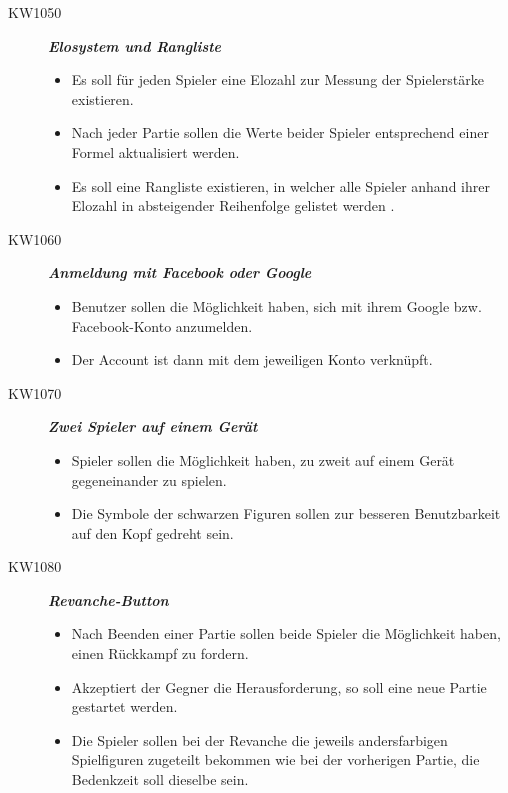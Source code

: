 \documentclass[parskip=full]{scrartcl}
\begin{document}
\begin{description}
	\item[KW1050] \textbf{\textit{\gls{Elo}system und Rangliste}}
	\begin{itemize}
	\item Es soll für jeden Spieler eine \gls{Elo}zahl zur Messung der Spielerstärke existieren.
	\item Nach jeder Partie sollen die Werte beider Spieler entsprechend einer Formel aktualisiert werden.
	\item Es soll eine Rangliste existieren, in welcher alle Spieler anhand ihrer \gls{Elo}zahl in absteigender Reihenfolge gelistet werden .
	\end{itemize}
	
	\item[KW1060] \textbf{\textit{Anmeldung mit Facebook oder Google}}
	\begin{itemize}
	\item Benutzer sollen die Möglichkeit haben, sich mit ihrem Google bzw. Facebook-Konto anzumelden.
	\item Der Account ist dann mit dem jeweiligen Konto verknüpft.
	\end{itemize}
	
	\item[KW1070] \textbf{\textit{Zwei Spieler auf einem Gerät}}
	\begin{itemize}
	\item Spieler sollen die Möglichkeit haben, zu zweit auf einem Gerät gegeneinander zu spielen.
	\item Die Symbole der schwarzen Figuren sollen zur besseren Benutzbarkeit auf den Kopf gedreht sein.
	\end{itemize}
	
	\item[KW1080] \textbf{\textit{\gls{Revanche}-Button}}
	\begin{itemize}
	\item Nach Beenden einer Partie sollen beide Spieler die Möglichkeit haben, einen Rückkampf zu fordern.
	\item Akzeptiert der Gegner die Herausforderung, so soll eine neue Partie gestartet werden.
	\item Die Spieler sollen bei der Revanche die jeweils andersfarbigen Spielfiguren zugeteilt bekommen wie bei der vorherigen Partie, die \gls{Bedenkzeit} soll dieselbe sein.
	\end{itemize}
	
\end{description}
\end{document}
